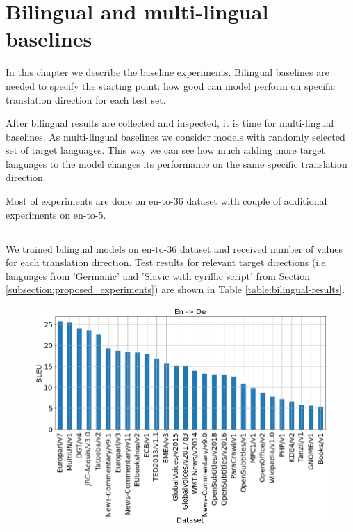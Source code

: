 \chapter{Bilingual and multi-lingual baselines}

In this chapter we describe the baseline experiments.
Bilingual baselines are needed to specify the starting point:
how good can model perform on specific translation direction
for each test set.

After bilingual results are collected and inspected, it is time for
multi-lingual baselines. As multi-lingual baselines we consider models
with randomly selected set of target languages. This way we can see
how much adding more target languages to the model changes its performance
on the same specific translation direction.

Most of experiments are done on \gls{en-to-36} dataset with couple of
additional experiments on \gls{en-to-5}.




\section{}
\label{section:bilingual_baseline}


We trained bilingual models on \gls{en-to-36} dataset and received
number of values for each translation direction.
Test results for relevant target directions (i.e. languages from
'Germanic' and 'Slavic with cyrillic script'
from Section \ref{subsection:proposed_experiments})
are shown in Table \ref{table:bilingual-results}.

\begin{figure}[h]
	\centering
	\includegraphics[width=0.9\columnwidth]{../img/bilingual_en_de.png}
	\label{fig:bilingual_en_de}
\end{figure}


